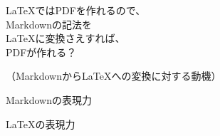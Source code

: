 \documentclass[14pt,dvipdfmx,uplatex]{beamer}
\begin{document}
\begin{frame}[plain]
  \begin{center}
    \color{kachi}\yasagoth
\LaTeX{}ではPDFを作れるので、\\
Markdownの記法を\\ 
\LaTeX{}に変換さえすれば、\\
PDFが作れる？
  \end{center}
    \vfill

    \begin{center}\footnotesize\sffamily
      （Markdownから\LaTeX{}への変換に対する動機）
    \end{center}
\end{frame}

{%
\begin{frame}[t]{\inhibitglue Markdownの表現力}
  \sffamily
  \begin{center}
  \end{center}
\end{frame}
}

{%
\begin{frame}[t]{\inhibitglue \LaTeX{}の表現力}
  \sffamily
  \begin{center}
  \end{center}
\end{frame}
}
\end{document}
